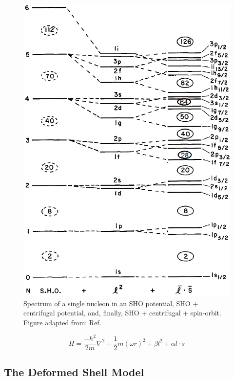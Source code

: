\begin{figure}[h!]
\label{fig:chp2-shell-model}
\centerline{\includegraphics[height=0.9\textheight]{./img/c2/shell_model.png}}
	\caption{Spectrum of a single nucleon in an SHO potential, SHO + centrifugal potential, and, finally, SHO + centrifugal + spin-orbit. Figure adapted from: Ref.\cite{casten}}
\end{figure}

\begin{equation}
\label{eqn:chp2-sm-hamil}
\mathbf{\mathit{H}} = \frac{-\hbar^2}{2m}\nabla^2 + \frac{1}{2}m(\omega r)^2 + \beta \mathit{l}^2 + \alpha \mathit{l}\cdot{}\mathit{s}
\end{equation}



\subsection{The Deformed Shell Model}
\label{ssec:models-shell-model-def-sm}

